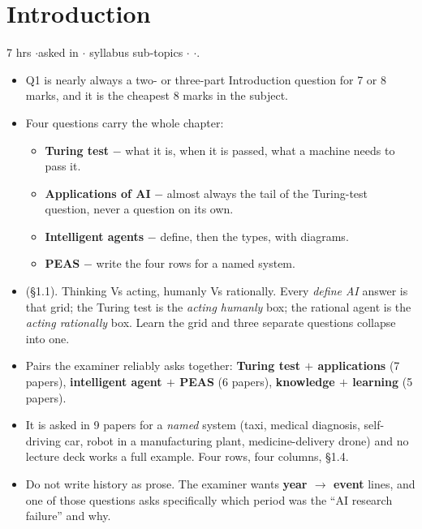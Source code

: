 \section{Introduction}

{\color{sub}\footnotesize 7 hrs \gap$\cdot$\gap asked in 
\gap$\cdot$ syllabus sub-topics \gap$\cdot$\gap {} \gap$\cdot$\gap {}.}

\begin{itemize}
  \item {} Q1 is nearly always a two- or three-part
        Introduction question for 7 or 8 marks, and it is the cheapest 8 marks in the
        subject.
  \item Four questions carry the whole chapter:
  \begin{itemize}
    \item \textbf{Turing test}  $-$ what it is, when it is passed, what a machine
          needs to pass it.
    \item \textbf{Applications of AI}  $-$ almost always the tail of the Turing-test
          question, never a question on its own.
    \item \textbf{Intelligent agents}  $-$ define, then the types, with diagrams.
    \item \textbf{PEAS}  $-$ write the four rows for a named system.
  \end{itemize}
  \item {}
        (\S1.1). Thinking Vs acting, humanly Vs rationally. Every \emph{define AI} answer
        is that grid; the Turing test is the \emph{acting humanly} box; the rational agent
        is the \emph{acting rationally} box. Learn the grid and three separate questions
        collapse into one.
  \item Pairs the examiner reliably asks together: \textbf{Turing test $+$ applications}
        (7 papers), \textbf{intelligent agent $+$ PEAS} (6 papers),
        \textbf{knowledge $+$ learning} (5 papers).
  \item {} It is asked in 9 papers for a
        \emph{named} system (taxi, medical diagnosis, self-driving car, robot in a
        manufacturing plant, medicine-delivery drone) and no lecture deck works a full
        example. Four rows, four columns, \S1.4.
  \item Do not write history as prose. The examiner wants \textbf{year $\rightarrow$ event}
        lines, and one of those questions asks specifically which period was the
        ``AI research failure'' and why.
\end{itemize}

